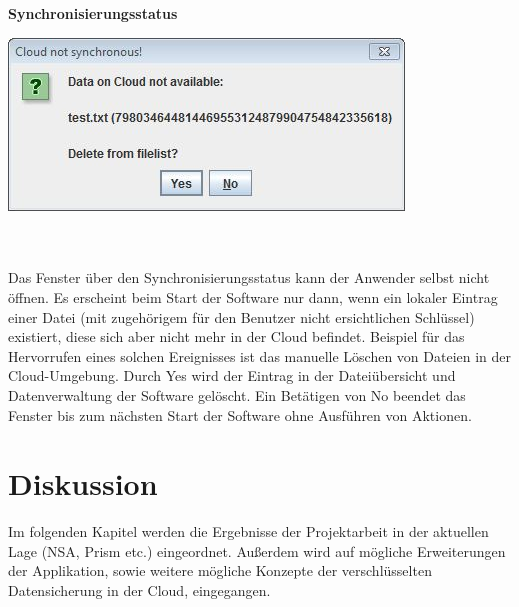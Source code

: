 \documentclass[12pt,a4paper,bibliography=totocnumbered,listof=totocnumbered]{scrartcl}
\begin{document}
\textbf{Synchronisierungsstatus}
\vspace{1em}
$\;$\\
\begin{minipage}{\linewidth}
	\centering
	\includegraphics[width=0.4\linewidth]{./img/Synchron.jpg}
	\label{Synchron}
\end{minipage}
\\\\Das Fenster über den Synchronisierungsstatus kann der Anwender selbst nicht öffnen. Es erscheint beim Start der Software nur dann, wenn ein lokaler Eintrag einer Datei (mit zugehörigem für den Benutzer nicht ersichtlichen Schlüssel) existiert, diese sich aber nicht mehr in der Cloud befindet. Beispiel für das Hervorrufen eines solchen Ereignisses ist das manuelle Löschen von Dateien in der Cloud-Umgebung. Durch Yes wird der Eintrag in der Dateiübersicht und Datenverwaltung der Software gelöscht. Ein Betätigen von No beendet das Fenster bis zum nächsten Start der Software ohne Ausführen von Aktionen.
\pagebreak

\section{Diskussion}\label{DiskussionV}
Im folgenden Kapitel werden die Ergebnisse der Projektarbeit in der aktuellen Lage (NSA, Prism etc.) eingeordnet. Außerdem wird auf mögliche Erweiterungen der Applikation, sowie weitere mögliche Konzepte der verschlüsselten Datensicherung in der Cloud, eingegangen. 
\end{document}
